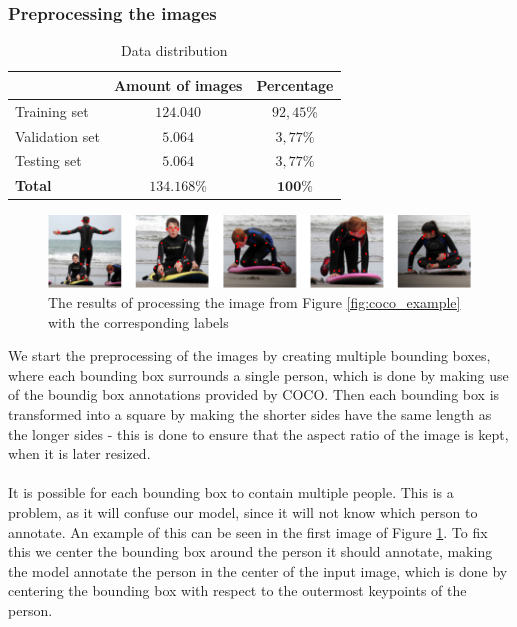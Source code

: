 \documentclass[./main.tex]{subfiles}
\begin{document}
\subsubsection{Preprocessing the images}
\begin{table}[htbp]
    \centering
    \begin{tabular}{l|c|c}
         & Amount of images & Percentage \\
        \hline
        Training set & $124.040$ & $92,45\%$ \\
        \hline
        Validation set & $5.064$ & $3,77\%$ \\
        \hline
        Testing set & $5.064$ & $3,77\%$ \\
        \hline
        \hline
        \textbf{Total} & $\bm{134.168}\%$ & $\bm{100}\%$ \\
        \hline
    \end{tabular}
    \caption{Data distribution}
    \label{tab:data_distribution}
\end{table}
\begin{figure}[htbp]
    \centering
    \includegraphics[width = \textwidth - 2 cm]{./entities/crop_img.PNG}
    \caption{The results of processing the image from Figure \ref{fig:coco_example} with the corresponding labels \cite{COCO_article}}
    \label{fig:crop_img}
\end{figure}
\noindent We start the preprocessing of the images by creating multiple bounding boxes, where each bounding box surrounds a single person, which is done by making use of the boundig box annotations provided by COCO. Then each bounding box is transformed into a square by making the shorter sides have the same length as the longer sides - this is done to ensure that the aspect ratio of the image is kept, when it is later resized. 
\\
\\
It is possible for each bounding box to contain multiple people. This is a problem, as it will confuse our model, since it will not know which person to annotate. An example of this can be seen in the first image of Figure \ref{fig:crop_img}. To fix this we center the bounding box around the person it should annotate, making the model annotate the person in the center of the input image, which is done by centering the bounding box with respect to the outermost keypoints of the person.
\end{document}
